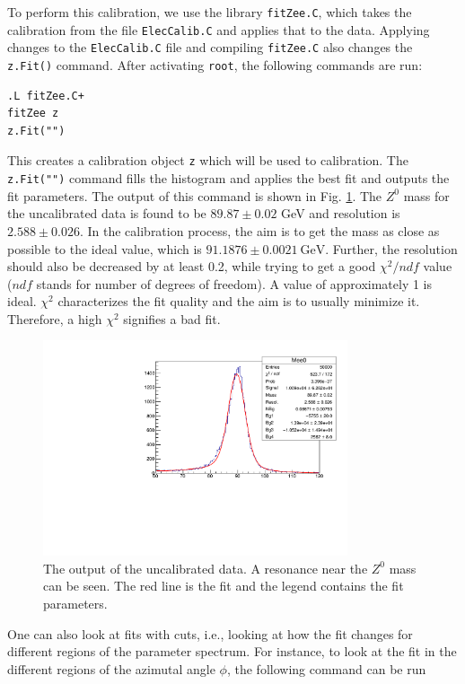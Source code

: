 \documentclass[a4paper]{report}
\numberwithin{equation}{section}
\begin{document}
To perform this calibration, we use the library \texttt{fitZee.C}, which takes the calibration from the file \texttt{ElecCalib.C} and applies that to the data. Applying changes to the \texttt{ElecCalib.C} file and compiling \texttt{fitZee.C} also changes the \texttt{z.Fit()} command. After activating \texttt{root}, the following commands are run:

\begin{verbatim}
.L fitZee.C+
fitZee z
z.Fit("")
\end{verbatim}
This creates a calibration object \texttt{z} which will be used to calibration. The \texttt{z.Fit("")} command fills the histogram and applies the best fit and outputs the fit parameters. The output of this command is shown in Fig. \ref{fig:uncalib}. The $Z^0$ mass for the uncalibrated data is found to be $89.87 \pm 0.02$ GeV and resolution is $2.588 \pm 0.026$. In the calibration process, the aim is to get the mass as close as possible to the ideal value, which is $91.1876 \pm 0.0021 \ \text{GeV}$. Further, the resolution should also be decreased by at least 0.2, while trying to get a good $\chi^2 / ndf$ value ($ndf$ stands for number of degrees of freedom). A value of approximately 1 is ideal. $\chi^2$ characterizes the fit quality and the aim is to usually minimize it. Therefore, a high $\chi^2$ signifies a bad fit. 

\begin{figure}[htpb]
    \centering
    \includegraphics[width=0.8\textwidth]{uncalib}
    \caption{The output of the uncalibrated data. A resonance near the $Z^0$ mass can be seen. The red line is the fit and the legend contains the fit parameters.}
    \label{fig:uncalib}
\end{figure}

One can also look at fits with cuts, i.e., looking at how the fit changes for different regions of the parameter spectrum. For instance, to look at the fit in the different regions of the azimutal angle $\phi$, the following command can be run
\end{document}
